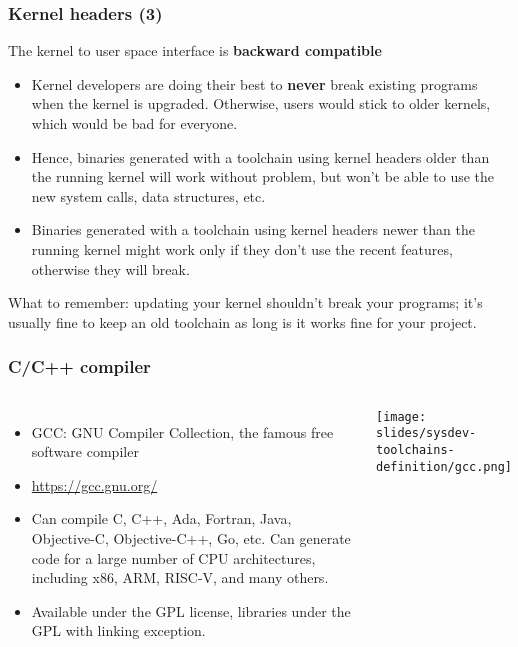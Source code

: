 \begin{frame}[fragile]
  \frametitle{Kernel headers (3)}
  The kernel to user space interface is {\bf backward compatible}
  \begin{itemize}
  \item Kernel developers are doing their best to {\bf never}
        break existing programs when the kernel is upgraded.
        Otherwise, users would stick to older kernels, which
        would be bad for everyone.
  \item Hence, binaries generated with a toolchain using kernel headers
        older than the running kernel will work without problem, but
        won't be able to use the new system calls, data structures, etc.
  \item Binaries generated with a toolchain using kernel headers
        newer than the running kernel might work only if they don't use
        the recent features, otherwise they will break.
  \end{itemize}
  What to remember: updating your kernel shouldn't break your programs;
  it's usually fine to keep an old toolchain as long is it works fine
  for your project.
\end{frame}

\begin{frame}
  \frametitle{C/C++ compiler}
  \begin{columns}[T]
    \begin{itemize}
    \item GCC: GNU Compiler Collection, the famous free software compiler
    \item \url{https://gcc.gnu.org/}
    \item Can compile C, C++, Ada, Fortran, Java, Objective-C,
      Objective-C++, Go, etc. Can generate code for a large number of CPU
      architectures, including x86, ARM, RISC-V, and many others.
    \item Available under the GPL license, libraries under the GPL with
      linking exception.
    \end{itemize}
    \texttt{[image: slides/sysdev-toolchains-definition/gcc.png]}
  \end{columns}
\end{frame}

